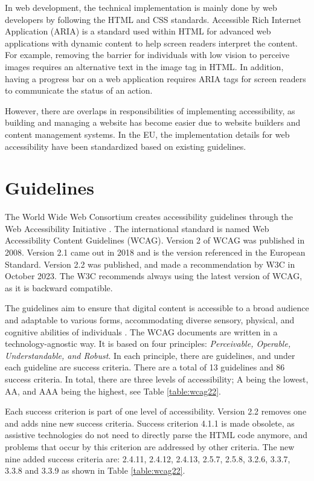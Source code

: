 In web development, the technical implementation is mainly done by web developers by following the HTML and CSS standards. Accessible Rich Internet Application (ARIA) is a standard used within HTML for advanced web applications with dynamic content to help screen readers interpret the content. For example, removing the barrier for individuals with low vision to perceive images requires an alternative text in the image tag in HTML. In addition, having a progress bar on a web application requires ARIA tags for screen readers to communicate the status of an action.

However, there are overlaps in responsibilities of implementing accessibility, as building and managing a website has become easier due to website builders and content management systems. In the EU, the implementation details for web accessibility have been standardized based on existing guidelines.

\section{Guidelines}

The World Wide Web Consortium creates accessibility guidelines through the Web Accessibility Initiative \citep{wcagoverview}. The international standard is named Web Accessibility Content Guidelines (WCAG). Version 2 of WCAG was published in 2008. Version 2.1 came out in 2018 and is the version referenced in the European Standard. Version 2.2 was published, and made a recommendation by W3C in October 2023. The W3C recommends always using the latest version of WCAG, as it is backward compatible. 

The guidelines aim to ensure that digital content is accessible to a broad audience and adaptable to various forms, accommodating diverse sensory, physical, and cognitive abilities of individuals \citep{wcag22}. The WCAG documents are written in a technology-agnostic way. It is based on four principles: \textit{Perceivable, Operable, Understandable, and Robust}. In each principle, there are guidelines, and under each guideline are success criteria. There are a total of 13 guidelines and 86 success criteria. In total, there are three levels of accessibility; A being the lowest, AA, and AAA being the highest, see Table \ref{table:wcag22}. 



Each success criterion is part of one level of accessibility. Version 2.2 removes one and adds nine new success criteria. Success criterion 4.1.1 is made obsolete, as assistive technologies do not need to directly parse the HTML code anymore, and problems that occur by this criterion are addressed by other criteria. The new nine added success criteria are: 2.4.11, 2.4.12, 2.4.13, 2.5.7, 2.5.8, 3.2.6, 3.3.7, 3.3.8 and 3.3.9 as shown in Table \ref{table:wcag22}. 

